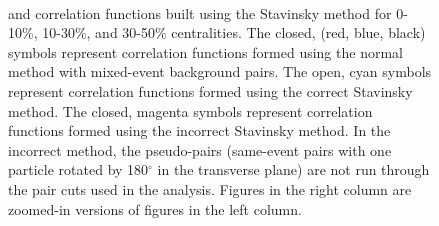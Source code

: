 \documentclass[../AnalysisNoteJBuxton.tex]{subfiles}
\begin{document}
\begin{figure}[h!]
  \\         
    
  \caption[\LamK Stavinsky Correlation Functions (Correct and Incorrect)]{\LamK and \ALamAK correlation functions built using the Stavinsky method for 0-10\%, 10-30\%, and 30-50\% centralities.  The closed, (red, blue, black) symbols represent correlation functions formed using the normal method with mixed-event background pairs.  The open, cyan symbols represent correlation functions formed using the correct Stavinsky method.  The closed, magenta symbols represent correlation functions formed using the incorrect Stavinsky method.  In the incorrect method, the pseudo-pairs (same-event pairs with one particle rotated by 180$^\circ$ in the transverse plane) are not run through the pair cuts used in the analysis.  Figures in the right column are zoomed-in versions of figures in the left column.}
  \label{fig:AllStavCfs_CorrectAndIncorrect}
\end{figure}
\end{document}
